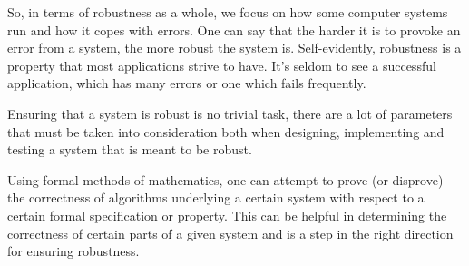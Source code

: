   So, in terms of robustness as a whole, we focus on how some computer systems run and how it copes with errors. One can say that the harder it is to provoke an error from a system, the more robust the system is. Self-evidently, robustness is a property that most applications strive to have. It's seldom to see a successful application, which has many errors or one which fails frequently.

  Ensuring that a system is robust is no trivial task, there are a lot of parameters that must be taken into consideration both when designing, implementing and testing a system that is meant to be robust. 

  Using formal methods of mathematics, one can attempt to prove (or disprove) the correctness of algorithms underlying a certain system with respect to a certain formal specification or property. This can be helpful in determining the correctness of certain parts of a given system and is a step in the right direction for ensuring robustness.